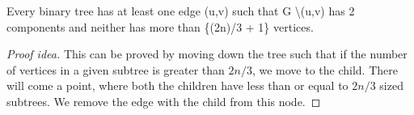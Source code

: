 \documentclass{article}
\begin{document}
\begin{theorem}
Every binary tree has at least one edge (u,v) such that G \textbackslash(u,v) has 2 components and neither has more than \{(2n)/3 + 1\} vertices.
\end{theorem}

\begin{proof}[Proof idea]
    This can be proved by moving down the tree such that if the number of vertices in a given subtree is greater than $2n/3$, we move to the child. There will come a point, where both the children have less than or equal to $2n/3$ sized subtrees. We remove the edge with the child from this node.


%
%    

\end{proof}
\end{document}

